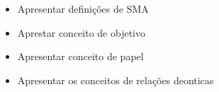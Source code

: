 \cite{multiagentsystemmodernapproach}
\cite{multiagentsystemwhatis}
\cite{organiationofmultiagentsystem}
\cite{amodelmultiagentsystemdynamicrelationship}
\cite{mosieframework}
\cite{modelingsocialactionforaiagents}
\begin{itemize}
    \item Apresentar definições de SMA
    \item Aprestar conceito de objetivo
    \item Apresentar conceito de papel
    \item Apresentar os conceitos de relações deonticas
\end{itemize}